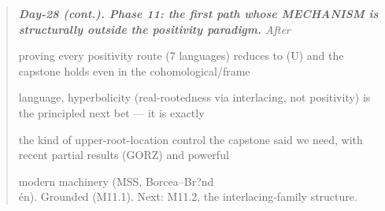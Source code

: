 \documentclass[10pt]{article}
\begin{document}
\begin{quote}\itshape
\textbf{Day-28 (cont.). Phase 11: the first path whose MECHANISM is structurally outside the positivity paradigm.} After\par
proving every positivity route (7 languages) reduces to (U) and the capstone holds even in the cohomological/frame\par
language, hyperbolicity (real-rootedness via interlacing, not positivity) is the principled next bet --- it is exactly\par
the kind of upper-root-location control the capstone said we need, with recent partial results (GORZ) and powerful\par
modern machinery (MSS, Borcea--Br?nd\\\'en). Grounded (M11.1). Next: M11.2, the interlacing-family structure.\par
\end{quote}
\end{document}

